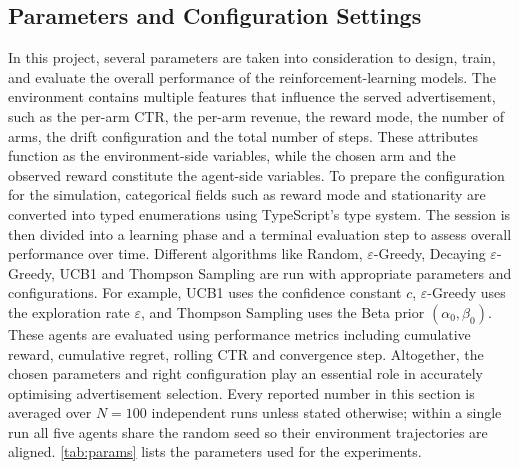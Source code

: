 \subsection{Parameters and Configuration Settings}
In this project, several parameters are taken into consideration to design, train, and evaluate the overall performance of the reinforcement-learning models. The environment contains multiple features that influence the served advertisement, such as the per-arm CTR, the per-arm revenue, the reward mode, the number of arms, the drift configuration and the total number of steps. These attributes function as the environment-side variables, while the chosen arm and the observed reward constitute the agent-side variables. To prepare the configuration for the simulation, categorical fields such as reward mode and stationarity are converted into typed enumerations using TypeScript's type system. The session is then divided into a learning phase and a terminal evaluation step to assess overall performance over time. Different algorithms like Random, $\varepsilon$-Greedy, Decaying $\varepsilon$-Greedy, UCB1 and Thompson Sampling are run with appropriate parameters and configurations. For example, UCB1 uses the confidence constant $c$, $\varepsilon$-Greedy uses the exploration rate $\varepsilon$, and Thompson Sampling uses the Beta prior $(\alpha_0, \beta_0)$. These agents are evaluated using performance metrics including cumulative reward, cumulative regret, rolling CTR and convergence step. Altogether, the chosen parameters and right configuration play an essential role in accurately optimising advertisement selection. Every reported number in this section is averaged over $N = 100$ independent runs unless stated otherwise; within a single run all five agents share the random seed so their environment trajectories are aligned. \cref{tab:params} lists the parameters used for the experiments.


